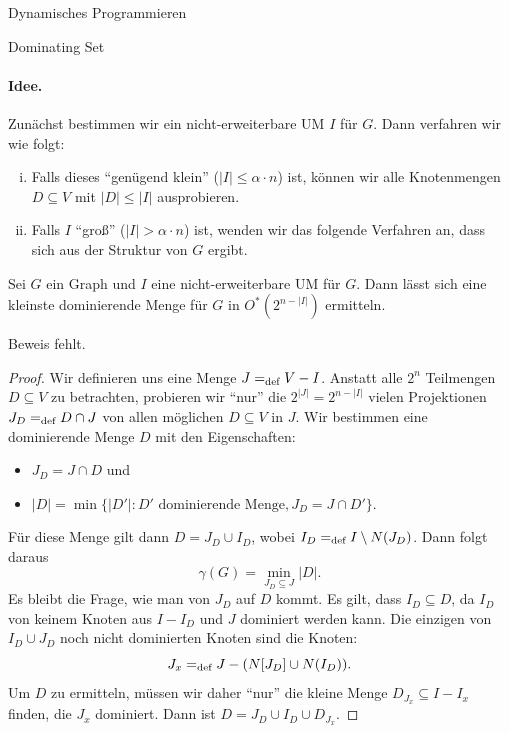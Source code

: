 \begin{chapter}{Dynamisches Programmieren}
\begin{section}{Dominating Set}
  \paragraph{Idee.} Zunächst bestimmen wir ein nicht-erweiterbare UM \(I\) für $G$. Dann verfahren wir wie folgt:
  \begin{enumerate}[i)]
   \item Falls dieses ``genügend klein'' ($|I| \leq\alpha \cdot n$) ist, können wir alle Knotenmengen \(D \subseteq V\) mit \(|D| \leq |I|\) ausprobieren. 
   \item Falls \(I\) ``groß'' ($|I| > \alpha \cdot n$) ist, wenden wir das folgende Verfahren an, dass sich aus der Struktur von $G$ ergibt.
  \end{enumerate}

  \begin{lemma}
    Sei \(G\) ein Graph und \(I\) eine nicht-erweiterbare UM für $G$. Dann lässt sich eine kleinste dominierende Menge für $G$ in \(O^*(2^{n-|I|})\) ermitteln.
  \end{lemma}

  Beweis fehlt.

  \begin{proof}
    Wir definieren uns eine Menge $J =_\text{def} V -I$. Anstatt alle $2^n$ Teilmengen $D\subseteq V$ zu betrachten, probieren wir ``nur'' die $2^{|J|} = 2^{n-|I|}$ vielen Projektionen \(J_D =_\text{def} D \cap J\) von allen möglichen $D\subseteq V$ in $J$. Wir bestimmen eine dominierende Menge $D$ mit den Eigenschaften: 
    \begin{itemize}
     \item $J_D = J \cap D$ und 
     \item $|D| = \min \{|D'|: D' \text{ dominierende Menge}, J_D = J \cap D'\}$.
    \end{itemize}
    Für diese Menge gilt dann $D = J_D \cup I_D$, wobei \(I_D =_\text{def} I \setminus N(J_D)\). Dann folgt daraus 
    \[\gamma(G) = \min_{J_D \subseteq J} |D|\text{.}\]
    Es bleibt die Frage, wie man von $J_D$ auf $D$ kommt. Es gilt, dass $I_D \subseteq D$, da $I_D$ von keinem Knoten aus $I - I_D$ und $J$ dominiert werden kann. Die einzigen von $I_D \cup J_D$ noch nicht dominierten Knoten sind die Knoten:
    \[J_x =_\text{def} J - (N[J_D]\cup N(I_D))\text{.}\]
    Um $D$ zu ermitteln, müssen wir daher ``nur'' die kleine Menge $D_{J_x} \subseteq I - I_x$ finden, die $J_x$ dominiert. Dann ist $D= J_D \cup I_D \cup D_{J_x}$.

  
  \end{proof}  


\end{section}
\end{chapter}
